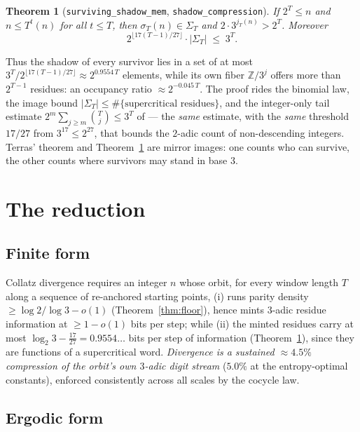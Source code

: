 \documentclass[11pt]{article}
\newtheorem{theorem}{Theorem}[section]
\newcommand{\Z}{\mathbb{Z}}
\newcommand{\code}[1]{\texttt{#1}}
\newcommand{\jodd}[2]{j_{#1}(#2)}
\begin{document}
\begin{theorem}[\code{surviving\_shadow\_mem},
\code{shadow\_compression}]\label{thm:confine}
If $2^T \le n$ and $n \le T^t(n)$ for all $t \le T$, then
$\sigma_T(n) \in \Sigma_T$ and $2 \cdot 3^{\jodd{T}{n}} > 2^T$.
Moreover
\[
2^{\lfloor 17(T-1)/27 \rfloor} \cdot |\Sigma_T| \;\le\; 3^T .
\]
\end{theorem}

Thus the shadow of every survivor lies in a set of at most
$3^T / 2^{\lfloor 17(T-1)/27\rfloor} \approx 2^{0.9554\,T}$ elements,
while its own fiber $\Z/3^{j}$ offers more than $2^{T-1}$ residues:
an occupancy ratio $\approx 2^{-0.045\,T}$. The proof rides the
binomial law, the image bound $|\Sigma_T| \le \#\{\text{supercritical
residues}\}$, and the integer-only tail estimate
$2^m \sum_{j \ge m}\binom{T}{j} \le 3^T$ of \cite{companion} --- the
\emph{same} estimate, with the \emph{same} threshold $17/27$ from
$3^{17} \le 2^{27}$, that bounds the $2$-adic count of non-descending
integers. Terras' theorem and Theorem~\ref{thm:confine} are mirror
images: one counts who can survive, the other counts where survivors
may stand in base $3$.

\section{The reduction}\label{sec:reduction}

\subsection*{Finite form}

Collatz divergence requires an integer $n$ whose orbit, for every
window length $T$ along a sequence of re-anchored starting points,
(i) runs parity density $\ge \log 2/\log 3 - o(1)$
(Theorem~\ref{thm:floor}), hence mints $3$-adic residue information at
$\ge 1 - o(1)$ bits per step; while (ii) the minted residues carry at
most $\log_2 3 - \tfrac{17}{27} = 0.9554\ldots$ bits per step of
information (Theorem~\ref{thm:confine}), since they are functions of a
supercritical word. \emph{Divergence is a sustained $\approx 4.5\%$
compression of the orbit's own $3$-adic digit stream} ($5.0\%$ at the
entropy-optimal constants), enforced consistently across all scales by
the cocycle law.

\subsection*{Ergodic form}
\end{document}
